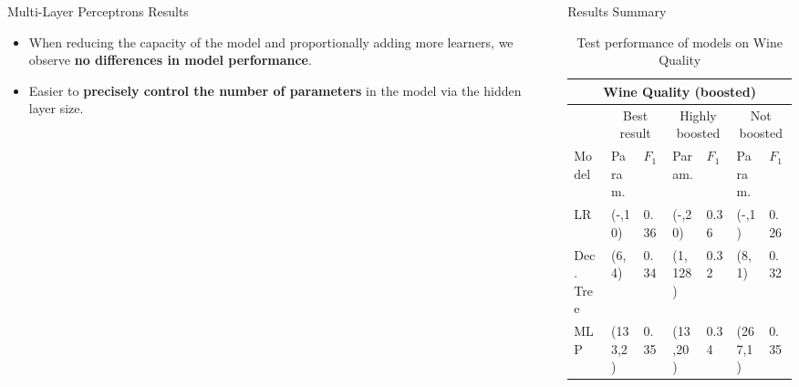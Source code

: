 \documentclass[final]{beamer}
\newlength{\sepwid}
\newlength{\onecolwid}
\newlength{\twocolwid}
\begin{document}
\begin{frame}[t]
\begin{columns}[t]
\begin{column}{\twocolwid}
\begin{columns}[t,totalwidth=\twocolwid]
\begin{column}{\onecolwid}
\begin{block}{Multi-Layer Perceptrons Results}
\begin{itemize}
    \item When reducing the capacity of the model and proportionally adding more learners, we observe \textbf{no differences in model performance}.
    \item  Easier to \textbf{precisely control the number of parameters} in the model via the hidden layer size.
\end{itemize}

\end{block}


\end{column} %

\end{columns} %

\end{column} %

\begin{column}{\sepwid}\end{column} %

\begin{column}{\onecolwid} %

\begin{block}{Results Summary}

\begin{table}[h!]
    \begin{center}
    \caption {Test performance of models on Wine Quality}
    \vspace{-65pt}
    \begin{tabular}{|l|l|l|l|l|l|l|}
        \hline
        \multicolumn{7}{|c|}{Wine Quality (boosted)}\\
        \hline
        &\multicolumn{2}{|c|}{Best result}&\multicolumn{2}{|c|}{Highly boosted }&\multicolumn{2}{|c|}{Not boosted}\\
        \hline
        Model & Param. & $F_1$ & Param. & $F_1$ & Param. & $F_1$ \\
        \hline \hline
         LR & (-,10) & 0.36 & (-,20) & 0.36 & (-,1) & 0.26 \\
         Dec. Tree & (6,4) & 0.34 & (1,128) & 0.32 & (8,1) & 0.32 \\
         MLP  & (133,2) & 0.35 & (13,20) & 0.34 & (267,1) & 0.35 \\
         \hline
    \end{tabular}
    \end{center}
    \label{table:Results_Wine}
\end{table}



\end{block}
\end{column}
\end{columns}
\end{frame}
\end{document}
